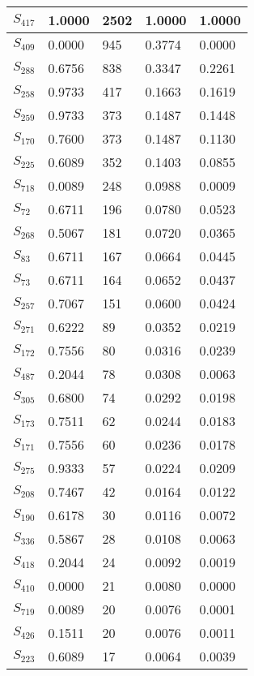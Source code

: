 \begin{xltabular}{\textwidth}{|X|X|X|X|X|}
        \hline
        \endlastfoot
    $S_{417}$ & 1.0000 & 2502 & 1.0000 & 1.0000 \\ \hline
 $S_{409}$ & 0.0000 & 945 & 0.3774 & 0.0000 \\ \hline
 $S_{288}$ & 0.6756 & 838 & 0.3347 & 0.2261 \\ \hline
 $S_{258}$ & 0.9733 & 417 & 0.1663 & 0.1619 \\ \hline
 $S_{259}$ & 0.9733 & 373 & 0.1487 & 0.1448 \\ \hline
 $S_{170}$ & 0.7600 & 373 & 0.1487 & 0.1130 \\ \hline
 $S_{225}$ & 0.6089 & 352 & 0.1403 & 0.0855 \\ \hline
 $S_{718}$ & 0.0089 & 248 & 0.0988 & 0.0009 \\ \hline
 $S_{72}$ & 0.6711 & 196 & 0.0780 & 0.0523 \\ \hline
 $S_{268}$ & 0.5067 & 181 & 0.0720 & 0.0365 \\ \hline
 $S_{83}$ & 0.6711 & 167 & 0.0664 & 0.0445 \\ \hline
 $S_{73}$ & 0.6711 & 164 & 0.0652 & 0.0437 \\ \hline
 $S_{257}$ & 0.7067 & 151 & 0.0600 & 0.0424 \\ \hline
 $S_{271}$ & 0.6222 & 89 & 0.0352 & 0.0219 \\ \hline
 $S_{172}$ & 0.7556 & 80 & 0.0316 & 0.0239 \\ \hline
 $S_{487}$ & 0.2044 & 78 & 0.0308 & 0.0063 \\ \hline
 $S_{305}$ & 0.6800 & 74 & 0.0292 & 0.0198 \\ \hline
 $S_{173}$ & 0.7511 & 62 & 0.0244 & 0.0183 \\ \hline
 $S_{171}$ & 0.7556 & 60 & 0.0236 & 0.0178 \\ \hline
 $S_{275}$ & 0.9333 & 57 & 0.0224 & 0.0209 \\ \hline
 $S_{208}$ & 0.7467 & 42 & 0.0164 & 0.0122 \\ \hline
 $S_{190}$ & 0.6178 & 30 & 0.0116 & 0.0072 \\ \hline
 $S_{336}$ & 0.5867 & 28 & 0.0108 & 0.0063 \\ \hline
 $S_{418}$ & 0.2044 & 24 & 0.0092 & 0.0019 \\ \hline
 $S_{410}$ & 0.0000 & 21 & 0.0080 & 0.0000 \\ \hline
 $S_{719}$ & 0.0089 & 20 & 0.0076 & 0.0001 \\ \hline
 $S_{426}$ & 0.1511 & 20 & 0.0076 & 0.0011 \\ \hline
 $S_{223}$ & 0.6089 & 17 & 0.0064 & 0.0039 \\ \hline

\end{xltabular}
